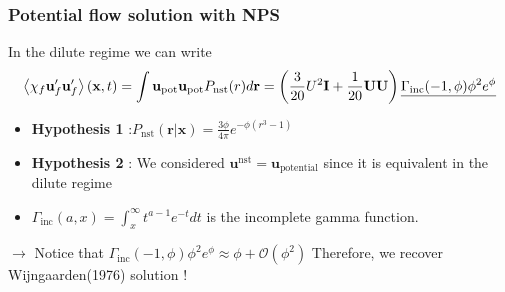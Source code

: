 \documentclass{sintefbeamer}
\begin{document}



\backmatter

\begin{frame}
  \frametitle{Potential flow solution with NPS}
  In the dilute regime we can write 
  \begin{multline*}
    \left<\chi_f \textbf{u}'_f\textbf{u}'_f\right>(\textbf{x},t)
    = 
    {\int \textbf{u}_\text{pot} \textbf{u}_\text{pot}  
    P_\text{nst}(r) d\textbf{r} }
    =  \left(\frac{3}{20} U^2\textbf{I} + \frac{1}{20}\textbf{UU} \right)
    \underline{\Gamma_\text{inc}(-1,\phi)\phi^2 e^\phi}
  \end{multline*}

  \begin{itemize}
    \item  \textbf{Hypothesis 1} :$P_\text{nst}(\textbf{r}|\textbf{x}) = \frac{3\phi}{4\pi}
    e^{ - \phi (r^3 - 1) }$
    \item \textbf{Hypothesis 2} : We considered $\textbf{u}^\text{nst} = \textbf{u}_\text{potential}$ since it is equivalent in the dilute regime
    \item $\Gamma_\text{inc}(a,x) = \int_x^\infty t^{a-1} e^{-t} dt $ is the incomplete gamma  function. 
  \end{itemize}

  $\to$ Notice that $\Gamma_\text{inc}(-1,\phi)\phi^2 e^\phi \approx  \phi + \mathcal{O}(\phi^2)$ Therefore, we recover  Wijngaarden(1976) solution ! 

\end{frame}
\end{document}

